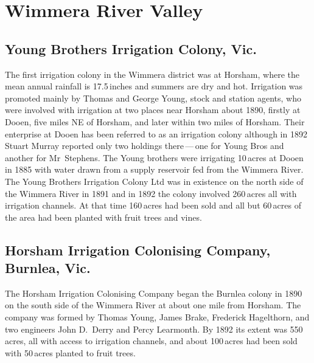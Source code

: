 \section*{Wimmera River Valley}

\subsection*{Young Brothers Irrigation Colony, Vic.}

The first irrigation colony in the Wimmera district was at Horsham,
where the mean annual rainfall is 17.5\,inches and summers are dry and
hot.  Irrigation was promoted mainly by Thomas and George Young,
 stock and station agents, who were involved
with irrigation at two places near Horsham about 1890, firstly at
Dooen,   five miles NE of Horsham, and later within
two miles of Horsham.  Their enterprise at Dooen has been referred to
as an irrigation colony although in 1892 Stuart Murray reported only
two holdings there\,---\,one for Young Bros and another for
Mr~Stephens.  The Young brothers were irrigating 10\,acres at Dooen in
1885 with water drawn from a supply
reservoir fed from the Wimmera River.  The
Young Brothers Irrigation Colony Ltd was in existence on the north
side of the Wimmera River in 1891 and in 1892 the colony involved
260\,acres all with irrigation channels.  At
that time 160\,acres had been sold and all but 60\,acres of the area
had been planted with fruit trees and
vines.

\subsection*{Horsham Irrigation Colonising Company, Burnlea, Vic.}

The Horsham Irrigation Colonising Company began the Burnlea colony in
1890 on the south side of the Wimmera River at
about one mile from Horsham.  The company was formed by Thomas Young,
James Brake, Frederick Hagelthorn, and two engineers John D.~Derry and
Percy Learmonth.  By 1892 its extent was 550\,acres, all with access
to irrigation channels, and about
100\,acres had been sold with 50\,acres planted to fruit
trees.

